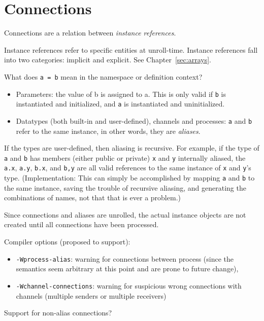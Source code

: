 

\chapter{Connections}
\label{sec:connections}

Connections are a relation between \emph{instance references}.  

Instance references refer to specific entities at unroll-time.  
Instance references fall into two categories: implicit and explicit.  
See Chapter~\ref{sec:arrays}.  

What does \verb|a = b| mean in the namespace or definition context?

\begin{itemize}
\item Parameters: the value of b is assigned to a.
	This is only valid if \verb|b| is instantiated and initialized, 
	and \verb|a| is instantiated and uninitialized.  
\item Datatypes (both built-in and user-defined), channels and processes:
	\verb|a| and \verb|b| refer to the same instance, in other words, 
	they are \emph{aliases}.
\end{itemize}

If the types are user-defined, then aliasing is recursive.  
For example, if the type of \verb|a| and \verb|b| has 
members (either public or private) \verb|x| and \verb|y| internally aliased, 
the \verb|a.x|, \verb|a.y|, \verb|b.x|, and \verb|b,y| are all 
valid references to the same instance of \verb|x| and \verb|y|'s type.  
(Implementation:
This can simply be accomplished by mapping \verb|a| and \verb|b|
to the same instance, saving the trouble of recursive aliasing, 
and generating the combinations of names, 
not that that is ever a problem.)

Since connections and aliases are unrolled, the actual instance objects 
are not created until all connections have been processed.  

Compiler options (proposed to support):
\begin{itemize}
\item \verb|-Wprocess-alias|:
	warning for connections between process
	(since the semantics seem arbitrary at this point and 
	are prone to future change), 
\item \verb|-Wchannel-connections|: 
	warning for suspicious wrong connections with channels
	(multiple senders or multiple receivers)
\end{itemize}


Support for non-alias connections?

